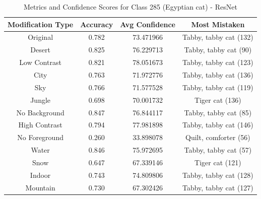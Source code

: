 \begin{table}
	\centering
	\begin{tabular}{|c|c|c|c|}
		\hline
		\textbf{Modification Type} & \textbf{Accuracy} & \textbf{Avg Confidence} & \textbf{Most Mistaken} \\
		\hline
		Original & 0.782 & 73.471966 & Tabby, tabby cat (132) \\
		\hline
		Desert & 0.825 & 76.229713 & Tabby, tabby cat (90) \\
		\hline
		Low Contrast & 0.821 & 78.051673 & Tabby, tabby cat (123) \\
		\hline
		City & 0.763 & 71.972776 & Tabby, tabby cat (136) \\
		\hline
		Sky & 0.766 & 71.577528 & Tabby, tabby cat (119) \\
		\hline
		Jungle & 0.698 & 70.001732 & Tiger cat (136) \\
		\hline
		No Background & 0.847 & 76.844117 & Tabby, tabby cat (85) \\
		\hline
		High Contrast & 0.794 & 77.981898 & Tabby, tabby cat (146) \\
		\hline
		No Foreground & 0.260 & 33.898078 & Quilt, comforter (56) \\
		\hline
		Water & 0.846 & 75.972695 & Tabby, tabby cat (57) \\
		\hline
		Snow & 0.647 & 67.339146 & Tiger cat (121) \\
		\hline
		Indoor & 0.743 & 74.809806 & Tabby, tabby cat (128) \\
		\hline
		Mountain & 0.730 & 67.302426 & Tabby, tabby cat (127) \\
		\hline
	\end{tabular}
	\caption{Metrics and Confidence Scores for Class 285 (Egyptian cat) - ResNet}
	\label{tab:metrics_confidence_class_285_resnet}
\end{table}

